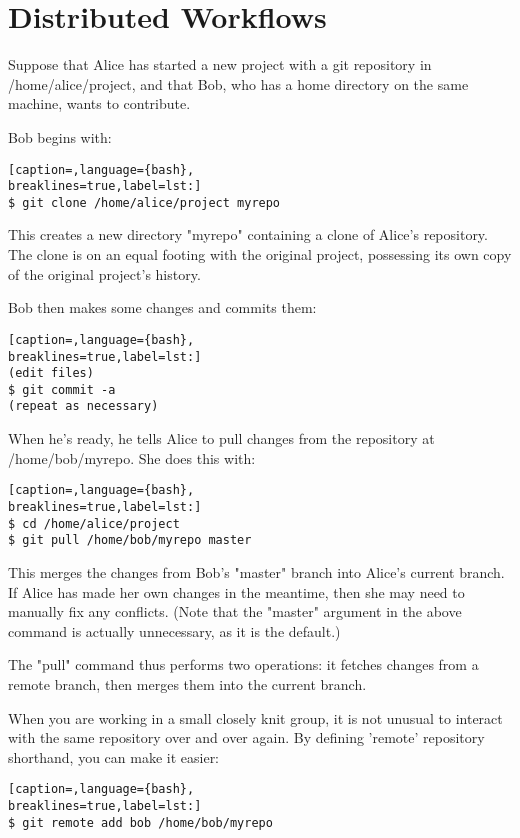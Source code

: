 \section{Distributed Workflows}
Suppose that Alice has started a new project with a git repository in
/home/alice/project, and that Bob, who has a home directory on the same
machine, wants to contribute.

Bob begins with:
\lstset{basicstyle=\scriptsize, numbers=none, captionpos=b, tabsize=4}
\begin{lstlisting}[caption=,language={bash},
breaklines=true,label=lst:]
$ git clone /home/alice/project myrepo
\end{lstlisting}

This creates a new directory "myrepo" containing a clone of Alice's repository.
The clone is on an equal footing with the original project, possessing its own
copy of the original project's history.

Bob then makes some changes and commits them:
\lstset{basicstyle=\scriptsize, numbers=none, captionpos=b, tabsize=4}
\begin{lstlisting}[caption=,language={bash},
breaklines=true,label=lst:]
(edit files)
$ git commit -a
(repeat as necessary)
\end{lstlisting}

When he's ready, he tells Alice to pull changes from the repository at
/home/bob/myrepo. She does this with:
\lstset{basicstyle=\scriptsize, numbers=none, captionpos=b, tabsize=4}
\begin{lstlisting}[caption=,language={bash},
breaklines=true,label=lst:]
$ cd /home/alice/project
$ git pull /home/bob/myrepo master
\end{lstlisting}

This merges the changes from Bob's "master" branch into Alice's current branch.
If Alice has made her own changes in the meantime, then she may need to
manually fix any conflicts. (Note that the "master" argument in the above
command is actually unnecessary, as it is the default.)

The "pull" command thus performs two operations: it fetches changes from a
remote branch, then merges them into the current branch.

When you are working in a small closely knit group, it is not unusual to
interact with the same repository over and over again. By defining 'remote'
repository shorthand, you can make it easier:
\lstset{basicstyle=\scriptsize, numbers=none, captionpos=b, tabsize=4}
\begin{lstlisting}[caption=,language={bash},
breaklines=true,label=lst:]
$ git remote add bob /home/bob/myrepo
\end{lstlisting}

